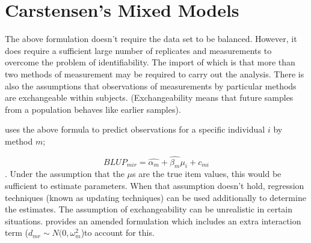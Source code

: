 \documentclass[12pt, a4paper]{report}
\theoremstyle{plain}
\theoremstyle{definition}
\theoremstyle{remark}
\begin{document}


\section{Carstensen's Mixed Models}





The above formulation doesn't require the data set to be balanced. However, it does require a sufficient large number of replicates and measurements to overcome the problem of identifiability. The import of which is that more than two methods of measurement may be required to carry out the analysis. There is also the assumptions that observations of measurements by particular methods are exchangeable within subjects. (Exchangeability means
that future samples from a population behaves like earlier samples).




\citet{BXC2004} uses the above formula to predict observations for
a specific individual $i$ by method $m$;

\begin{equation}BLUP_{mir} = \hat{\alpha_{m}} + \hat{\beta_{m}}\mu_{i} +
c_{mi} \end{equation}. Under the assumption that the $\mu$s are
the true item values, this would be sufficient to estimate
parameters. When that assumption doesn't hold, regression
techniques (known as updating techniques) can be used additionally
to determine the estimates. The assumption of exchangeability can
be unrealistic in certain situations. \citet{BXC2004} provides an
amended formulation which includes an extra interaction term ($
d_{mr} \sim N(0,\omega^{2}_{m}$)to account for this.

\bigskip
 
\end{document}
